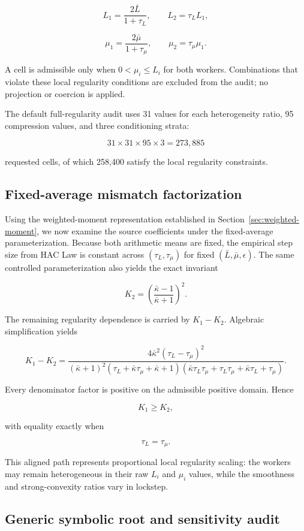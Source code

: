 \[
L_1=\frac{2\bar L}{1+\tau_L},
\qquad
L_2=\tau_L L_1,
\]

\[
\mu_1=\frac{2\bar\mu}{1+\tau_\mu},
\qquad
\mu_2=\tau_\mu\mu_1.
\]

A cell is admissible only when $0<\mu_i\le L_i$ for both workers. Combinations that violate these local regularity conditions are excluded from the audit; no projection or coercion is applied.

The default full-regularity audit uses 31 values for each heterogeneity ratio, 95 compression values, and three conditioning strata:

\[
31\times31\times95\times3=273{,}885
\]

requested cells, of which 258,400 satisfy the local regularity constraints.


\subsection{Fixed-average mismatch factorization}

Using the weighted-moment representation established in Section~\ref{sec:weighted-moment}, we now examine the source coefficients under the fixed-average parameterization. Because both arithmetic means are fixed, the empirical step size from HAC Law is constant across $(\tau_L,\tau_\mu)$ for fixed $(\bar L,\bar{\mu},\epsilon)$. The same controlled parameterization also yields the exact invariant

\[
K_2=\left(\frac{\bar\kappa-1}{\bar\kappa+1}\right)^2.
\]

The remaining regularity dependence is carried by $K_1-K_2$. Algebraic simplification yields

\[
K_1-K_2=
\frac{4\bar\kappa^2(\tau_L-\tau_\mu)^2}
{(\bar\kappa+1)^2
(\tau_L+\bar\kappa\tau_\mu+\bar\kappa+1)
(\bar\kappa\tau_L\tau_\mu+\tau_L\tau_\mu+\bar\kappa\tau_L+\tau_\mu)}.
\]

Every denominator factor is positive on the admissible positive domain. Hence

\[
K_1\ge K_2,
\]

with equality exactly when

\[
\tau_L=\tau_\mu.
\]

This aligned path represents proportional local regularity scaling: the workers may remain heterogeneous in their raw $L_i$ and $\mu_i$ values, while the smoothness and strong-convexity ratios vary in lockstep.

\subsection{Generic symbolic root and sensitivity audit}

